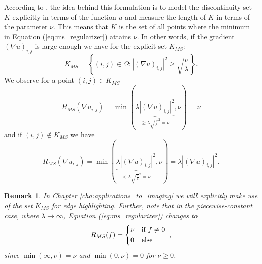 \documentclass[abstracton]{scrreprt}
\newtheorem{remark}[theorem]{Remark}
\begin{document}
        According to \cite{Strekalovskiy-Cremers-eccv14}, the idea behind this formulation is to model the discontinuity set $K$ explicitly in terms of the function $u$ and measure the length of $K$ in terms of the parameter $\nu$. This means that $K$ is the set of all points where the minimum in Equation (\ref{eq:ms_regularizer}) attains $\nu$. In other words, if the gradient $(\nabla u)_{i,j}$ is large enough we have for the explicit set $K_{MS}$:
            \begin{equation}
                K_{MS} = \left\{ (i, j) \in \Omega : |(\nabla u)_{i, j}|^{2} \ge \sqrt{\frac{\nu}{\lambda}} \right\}.
                \label{eq:edge_set_k}
            \end{equation}
        We observe for a point $(i, j) \in K_{MS}$
            $$
                R_{MS}(\nabla u_{i, j}) = \min(\underbrace{\lambda|(\nabla u)_{i, j}|^{2}}_{\ge \lambda \sqrt{\frac{\nu}{\lambda}}^{2} = \nu}, \nu) = \nu
            $$
        and if $(i, j) \notin K_{MS}$ we have
            $$
                R_{MS}(\nabla u_{i, j}) = \min(\underbrace{\lambda|(\nabla u)_{i, j}|^{2}}_{< \lambda \sqrt{\frac{\nu}{\lambda}}^{2} = \nu}, \nu) = \lambda|(\nabla u)_{i, j}|^{2}.
            $$
        \begin{remark}
            In Chapter \ref{cha:applications_to_imaging} we will explicitly make use of the set $K_{MS}$ for edge highlighting. Further, note that in the piecewise-constant case, where $\lambda \to \infty$, Equation (\ref{eq:ms_regularizer}) changes to
                $$
                    R_{MS}(f) = 
                        \begin{dcases*}
                            \nu & \textnormal{if $f \ne 0$} \\
                            0 & \textnormal{else}
                        \end{dcases*},
                $$
            since $\min(\infty, \nu) = \nu$ and $\min(0, \nu) = 0$ for $\nu \ge 0$.
        \end{remark}
\end{document}
